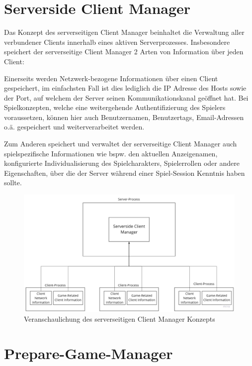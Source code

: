 \section{Serverside Client Manager}

\label{serverside_client_manager}

Das Konzept des serverseitigen Client Manager beinhaltet die Verwaltung aller verbundener Clients innerhalb eines aktiven Serverprozesses. Insbesondere speichert der serverseitige Client Manager 2 Arten von Information über jeden Client:

Einerseits werden Netzwerk-bezogene Informationen über einen Client gespeichert, im einfachsten Fall ist dies lediglich die IP Adresse des Hosts sowie der Port, auf welchem der Server seinen Kommunikationskanal geöffnet hat. Bei Spielkonzepten, welche eine weitergehende Authentifizierung des Spielers voraussetzen, können hier auch Benutzernamen, Benutzertags, Email-Adressen o.ä. gespeichert und weiterverarbeitet werden.

Zum Anderen speichert und verwaltet der serverseitige Client Manager auch spielspezifische Informationen wie bspw. den aktuellen Anzeigenamen, konfigurierte Individualisierung des Spielcharakters, Spielerrollen oder andere Eigenschaften, über die der Server während einer Spiel-Session Kenntnis haben sollte.

\begin{figure}
	\centering
	\includegraphics[width=150mm]{images/serversided_client_manager.jpg}
	\caption[Serversided Client Manager]{Veranschaulichung des serverseitigen Client Manager Konzepts}
	\label{pic:serversided_client_manager}
\end{figure}

\section{Prepare-Game-Manager}

